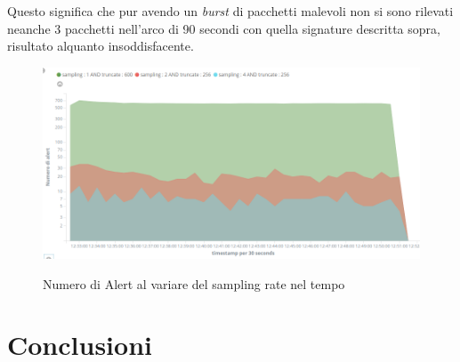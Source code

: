 \documentclass[12pt,a4paper,openright,twoside]{report}
\renewcommand{\chaptermark}[1]{\markboth{\thechapter.\ #1}{}}
\begin{document}
Questo significa che pur avendo un {\it burst} di pacchetti malevoli non si sono
rilevati neanche 3 pacchetti nell'arco di 90 secondi con quella signature descritta
sopra, risultato alquanto insoddisfacente.

\begin{figure}[h!]
\begin{center}                          %
  \includegraphics[width=\textwidth]{images/CTU-time.png}
  \caption{Numero di Alert al variare del sampling rate nel tempo}\label{ctu:time}
  \label{}
\end{center}
\end{figure}

\clearpage


\clearpage{\pagestyle{empty}\cleardoublepage}
\chapter*{Conclusioni}
\renewcommand{\chaptermark}[1]{\markright{\thechapter \ #1}{}}
\lhead[\fancyplain{}{\bfseries\thepage}]{\fancyplain{}{\bfseries\rightmark}}
\appendix                               %
\end{document}
